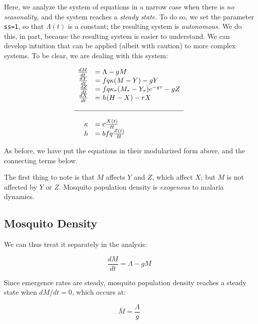 \documentclass[
]{book}
\begin{document}
Here, we analyze the system of equations in a narrow case when there is \emph{no seasonality,} and the system reaches a \emph{steady state.} To do so, we set the parameter \texttt{ss=1}, so that \(\Lambda(t)\) is a constant; the resulting system is \emph{autonomous.} We do this, in part, because the resulting system is easier to understand. We can develop intuition that can be applied (albeit with caution) to more complex systems. To be clear, we are dealing with this system:

\begin{equation}
\begin{array}{rl}
\frac{dM}{dt} &= \Lambda - g M \\
\frac{dY}{dt} &= fq\kappa(M-Y) - g Y \\
\frac{dZ}{dt} &= fq\kappa_\tau(M_\tau-Y_\tau)e^{-g\tau} - g Z \\
\frac{dX}{dt} &= h (H-X) - rX  \\ \\ \hline \\ 
\kappa &= c \frac{X(t)}{H} \\
h &= b fq \frac{Z(t)}{H} \\
\end{array}
\end{equation}

As before, we have put the equations in their modularized form above, and the connecting terms below.

The first thing to note is that \(M\) affects \(Y\) and \(Z\), which affect \(X\); but \(M\) is not affected by \(Y\) or \(Z\). Mosquito population density is \emph{exogenous} to malaria dynamics.

\hypertarget{mosquito-density}{%
\subsection{Mosquito Density}\label{mosquito-density}}

We can thus treat it separately in the analysis:

\begin{equation}
\frac{dM}{dt} = \Lambda - g M 
\end{equation}

Since emergence rates are steady, mosquito population density reaches a steady state when \(dM/dt=0\), which occurs at:

\begin{equation}
\bar M = \frac{\Lambda}{g} 
\end{equation}
\end{document}
